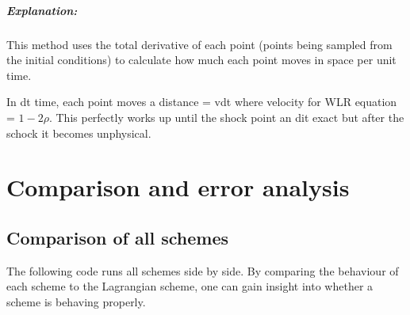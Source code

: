 \documentclass[11pt]{article}
\begin{document}
    \subparagraph{Explanation:}\label{explanation}

This method uses the total derivative of each point (points being
sampled from the initial conditions) to calculate how much each point
moves in space per unit time.

In dt time, each point moves a distance = vdt where velocity for WLR
equation = \(1-2\rho\). This perfectly works up until the shock point an
dit exact but after the schock it becomes unphysical.

    \section{Comparison and error
analysis}\label{comparison-and-error-analysis}

    \subsection{Comparison of all schemes}\label{comparison-of-all-schemes}

The following code runs all schemes side by side. By comparing the
behaviour of each scheme to the Lagrangian scheme, one can gain insight
into whether a scheme is behaving properly.
\end{document}
